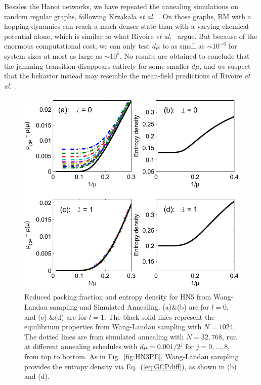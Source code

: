 Besides the Hanoi networks, we have repeated the annealing simulations on random regular graphs, 
following Krzakala {\it et al.}~\cite{Krzakala2008}. On those graphs, BM with a hopping dynamics 
can reach a much denser state than with a varying chemical potential alone, which is similar to what Rivoire {\it  et al.}~\cite{Rivoire03} argue. But because of the enormous computational cost, we can only test $d\mu$ to as small as $\sim10^{-6}$ for system sizes at most as large as $\sim 10^5$. No results are obtained to conclude that the jamming transition disappears entirely for some smaller $d\mu$, and we suspect that the behavior instead may resemble the mean-field predictions of Rivoire {\it et al.} \cite{Rivoire03}.  

\begin{figure}
\centering \includegraphics[width=1\columnwidth]{Chapter-2/Paper_HN5_PE_Plot}
\protect\caption{Reduced packing fraction and entropy density for HN5 from Wang-Landau
sampling and Simulated Annealing. (a)\&(b) are for $l=0$, and (c)
\&(d) are for $l=1$. The black solid lines represent the equilibrium
properties from Wang-Landau sampling with $N=1024$. The dotted lines
are from simulated annealing with $N=32,768$, run at different annealing
schedules with $d\mu=0.001/2^{j}$ for $j=0,\ldots,8$, from top to
bottom. As in Fig.~\ref{fig:HN3PE}, Wang-Landau sampling provides
the entropy density via Eq.~(\ref{eq:GCPdiff}), as shown in (b) and
(d).}
\label{fig:HN5PE} 
\end{figure}


